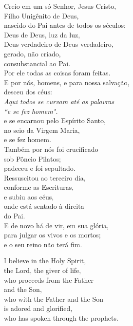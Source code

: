 \documentclass[10pt,a5]{article}
\begin{document}
\begin{paracol}{2}
\switchcolumn

Creio em um só Senhor, Jesus Cristo,\\
Filho Unigênito de Deus,  \\
nascido do Pai antes de todos os séculos: \\
Deus de Deus, luz da luz,  \\
Deus verdadeiro de Deus verdadeiro,  \\
gerado, não criado,\\
consubstancial ao Pai.  \\
Por ele todas as coisas foram feitas.  \\
E por nós, homens, e para nossa salvação, \\
desceu dos céus: \\
{\color{red}\hspace*{4em}\small \textit{Aqui todos se curvam at\'e as palavras }}\\
{\color{red}\hspace*{6em}\small \textit{``e se fez homem".}}\\
e se encarnou pelo Espírito Santo,  \\
no seio da Virgem Maria, \\
e se fez homem. \\
Também por nós foi crucificado \\
sob Pôncio Pilatos;  \\
padeceu e foi sepultado.  \\
Ressuscitou ao terceiro dia,  \\
conforme as Escrituras,  \\
e subiu aos céus,  \\
onde está sentado à direita \\
do Pai.  \\
E de novo há de vir, em sua glória,  \\
para julgar os vivos e os mortos;  \\
e o seu reino não terá fim.  \\

\switchcolumn

I believe in the Holy Spirit,\\
the Lord, the giver of life,\\
who proceeds from the Father\\
and the Son,\\
who with the Father and the Son\\
is adored and glorified,\\
who has spoken through the prophets.\\


\end{paracol}
\end{document}
